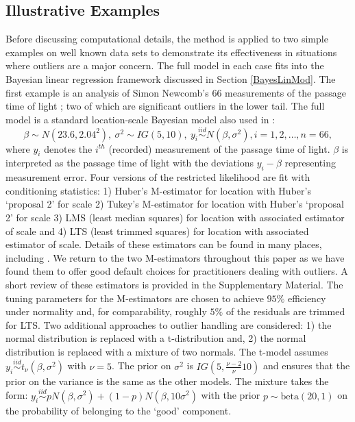 \documentclass[ba]{imsart}
\newcommand{\iid}{\stackrel{iid}{\sim}}
\newcommand{\response}[1]{{\color{blue}#1}}
\begin{document}
\subsection{Illustrative Examples}
\label{illustrations}
Before discussing computational details, the method is applied to two simple examples on well known data sets to demonstrate its effectiveness in situations where outliers are a major concern. The full model in each case fits into the Bayesian linear regression framework discussed in Section \ref{BayesLinMod}. The first example is an analysis of Simon Newcomb's 66 measurements of the passage time of light \citep{stigler1977}; two of which are significant outliers in the lower tail. The full model is a standard location-scale Bayesian model also used in \cite{lee2014}:
\begin{equation}
\beta\sim N(23.6, 2.04^{2}),\  \sigma^{2}\sim IG(5, 10), \ y_{i}\iid N (\beta, \sigma^{2}), i=1,2,\dots, n=66,
\end{equation}
where $y_{i}$ denotes the $i^{th}$ (recorded) measurement of the passage time of light. $\beta$ is interpreted as the passage time of light with the deviations $y_i - \beta$ representing measurement error.
Four versions of the restricted likelihood are fit with conditioning statistics: 1) Huber's M-estimator for location with Huber's `proposal 2'  for scale 2)  Tukey's M-estimator for location with Huber's `proposal 2'  for scale 3) LMS (least median squares) for location with associated estimator of scale and 4) LTS (least trimmed squares)  for location with associated estimator of scale. \response{Details of these estimators can be found in many places, including \citep{huber2009}. We return to the two M-estimators throughout this paper as we have found them to offer good default choices for practitioners dealing with outliers. A short review of these estimators is provided in the Supplementary Material.}  The tuning parameters for the M-estimators are chosen to achieve $95\%$ efficiency under normality \citep{huber2009} and, for comparability, roughly $5\%$ of the residuals are trimmed for LTS.  Two additional approaches to outlier handling are considered: 1) the normal distribution is replaced with a t-distribution and, 2) the normal distribution is replaced with a mixture of two normals. The t-model assumes $y_{i}\iid t_{\nu} (\beta, \sigma^{2})$ with $\nu=5$. The prior on $\sigma^{2}$ is $IG(5, \frac{\nu-2}{\nu}10)$ and ensures that the prior on the variance is the same as the other models. The mixture takes the form: $y_{i}\iid pN (\beta, \sigma^{2}) + (1-p)N(\beta, 10\sigma^{2})$ with the prior $p \sim \text{beta}(20,1)$ on the probability of belonging to the `good' component.  
\end{document}
